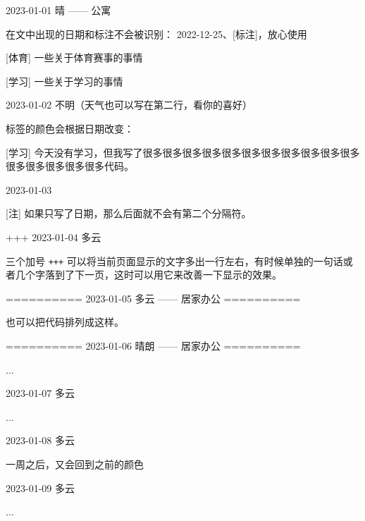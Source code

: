 \documentclass[11pt, paperstyle=light yellow, color entry]{jwjournal}
\begin{document}
2023-01-01 晴 —— 公寓

  在文中出现的日期和标注不会被识别： 2022-12-25、[标注]，放心使用

  [体育] 一些关于体育赛事的事情

  [学习] 一些关于学习的事情



2023-01-02
不明（天气也可以写在第二行，看你的喜好）

  标签的颜色会根据日期改变：

  [学习] 今天没有学习，但我写了很多很多很多很多很多很多很多很多很多很多很多很多很多很多很多很多代码。



2023-01-03

  [注] 如果只写了日期，那么后面就不会有第二个分隔符。


+++
2023-01-04  多云

  三个加号 \texttt{+++} 可以将当前页面显示的文字多出一行左右，有时候单独的一句话或者几个字落到了下一页，这时可以用它来改善一下显示的效果。



==========
2023-01-05    多云        —— 居家办公
==========

也可以把代码排列成这样。


==========
2023-01-06    晴朗        —— 居家办公
==========

...



2023-01-07  多云

  ...



2023-01-08  多云

  一周之后，又会回到之前的颜色



2023-01-09  多云

  ...
\end{document}
